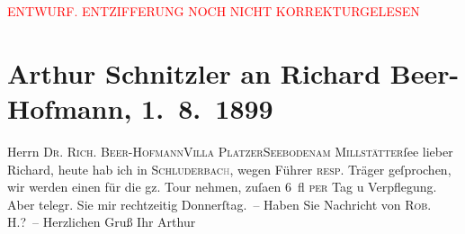 
\begin{center}
            \textcolor{red}{ENTWURF. ENTZIFFERUNG NOCH NICHT KORREKTURGELESEN}
                      \end{center}
            
               \section[Arthur Schnitzler an Richard Beer-Hofmann, 1. 8. 1899]{ Arthur Schnitzler an Richard Beer-Hofmann, 1. 8. 1899}\nopagebreak{}\rehead{ }\begin{ledgroupsized}[t]{13cm}\normalsize\beginnumbering{} \toendnotes[C]{\smallbreak\pagebreak[2]} 
\pstart{}{\pb}Herrn \textsc{Dr. Rich.
                     Beer-Hofmann}\pend{}\pstart{}\textsc{Villa Platzer}\pend{}\pstart{}\textsc{Seeboden}\pend{}\pstart{}\textsc{am
                     Millstätter}ſee\pend{}{\bigskip}\pstart
           \noindent{}{\pb}lieber Richard, heute hab ich in
                  \textsc{Schluderbac\textcolor{gray}{h}}, wegen
               Führer \textsc{resp.} Träger geſprochen, wir werden einen für die
               gz. Tour nehmen, zuſa{\geminationm}en 6 fl \textsc{per} Tag u Verpflegung. Aber telegr. Sie mir rechtzeitig Donnerſtag. –
               Haben Sie Nachricht von \textsc{Rob.
                     H.}? –\pend
           \pstart Herzlichen Gruß Ihr \spacefill\mbox{Arthur}\pend{}\endnumbering{}\end{ledgroupsized}  \newcommand{\dateiname}{L00956}\newcommand{\titel}{Arthur Schnitzler an Richard Beer-Hofmann, 1. 8. 1899}\newcommand{\editorInnen}{Martin Anton Müller und Gerd-Hermann Susen}
      